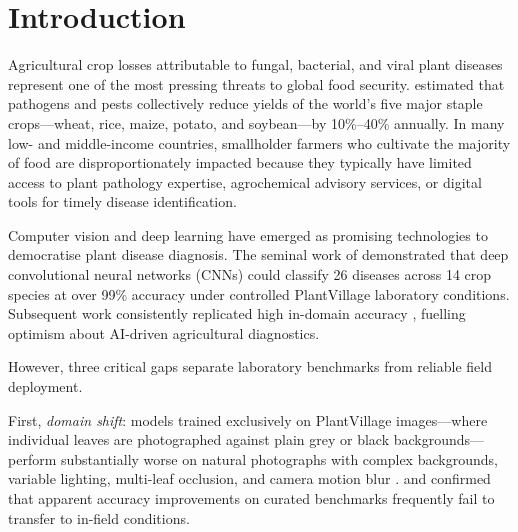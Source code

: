 \documentclass[pdflatex,sn-mathphys-num]{sn-jnl}
\theoremstyle{thmstyleone}%
\theoremstyle{thmstyletwo}%
\theoremstyle{thmstylethree}%
\begin{document}

\maketitle


\section{Introduction}
\label{sec:introduction}

Agricultural crop losses attributable to fungal, bacterial, and viral plant diseases
represent one of the most pressing threats to global food security. \citet{savary2019burden}
estimated that pathogens and pests collectively reduce yields of the world's five major
staple crops---wheat, rice, maize, potato, and soybean---by 10\%–40\% annually. In many
low- and middle-income countries, smallholder farmers who cultivate the majority of food
are disproportionately impacted because they typically have limited access to plant
pathology expertise, agrochemical advisory services, or digital tools for timely disease
identification.

Computer vision and deep learning have emerged as promising technologies to democratise
plant disease diagnosis. The seminal work of \citet{mohanty2016} demonstrated that deep
convolutional neural networks (CNNs) could classify 26 diseases across 14 crop species
at over 99\% accuracy under controlled PlantVillage \citep{hughes2015plantvillage}
laboratory conditions. Subsequent work consistently replicated high in-domain accuracy
\citep{ferentinos2018deep,chen2020identification,atila2021plant}, fuelling optimism about
AI-driven agricultural diagnostics.

However, three critical gaps separate laboratory benchmarks from reliable field
deployment.

First, \textit{domain shift}: models trained exclusively on PlantVillage images---where
individual leaves are photographed against plain grey or black backgrounds---perform
substantially worse on natural photographs with complex backgrounds, variable lighting,
multi-leaf occlusion, and camera motion blur \citep{barbedo2016review,singh2020plant,dsouza2023generalization}.
\citet{toda2019deep} and \citet{thapa2020plant} confirmed that apparent accuracy improvements
on curated benchmarks frequently fail to transfer to in-field conditions.
\end{document}
